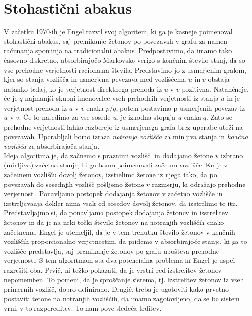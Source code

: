 \documentclass[twoside,11pt]{article}
\begin{document}
\section{Stohastični abakus}
V začetku 1970-ih je Engel razvil svoj algoritem, ki ga je kasneje poimenoval stohastični abakus, saj premikanje žetonov po povezavah v grafu za namen računanja spominja na tradicionalni abakus.
\indent Predpostavimo, da imamo tako časovno diskretno, absorbirajočo Markovsko verigo s končnim število stanj, da so vse prehodne verjetnosti racionalna števila. Predstavimo jo z usmerjenim grafom, kjer so stanja vozlišča in usmerjena povezava med vozliščema $u$ in $v$ obstaja natanko tedaj, ko je verjetnost direktnega prehoda iz $u$ v $v$ pozitivna. 
Natančneje, če je $q$ najmanjši skupni imenovalec vseh prehodnih verjetnosti iz stanja $u$ in je verjetnost prehoda iz $u$ v $v$ enaka $p/q$, potem postavimo p usmerjenih povezav iz $u$ v $v$. Če to naredimo za vse sosede $u$, je izhodna stopnja $u$ enaka $q$. Zato se prehodne verjetnosti lahko razberejo iz usmerjenega grafa brez uporabe uteži na povezavah. 
Uporabljali bomo izraza \emph{notranja vozlišča} za minljiva stanja in \emph{končna vozlišča} za absorbirajoča stanja. \\
\indent Ideja algoritma je, da začnemo s praznimi vozlišči in dodajamo žetone v izbrano (minljivo) začetno stanje, ki ga bomo poimenovali začetno vozlišče. Ko je v začetnem vozlišču dovolj žetonov, izstrelimo žetone iz njega tako, da po povezavah do sosednjih vozlišč pošljemo žetone v razmerju, ki odražajo prehodne verjetnosti. Ponavljamo postopek dodajanja žetonov v začetno vozlišče in izstreljevanja dokler nima vsak od sosedov dovolj žetonov, da izstrelimo te itn. Predstavljajmo si, da ponavljamo postopek dodajanja žetonov in izstrelitev žetonov in
da je na neki točki število žetonov na notranjih vozliščih enako začetnemu. Engel je utemeljil, da je v tem trenutku število žetonov v končnih vozliščih proporcionalno verjetnostim, da pridemo v absorbirajoče stanje, ki ga to vozlišče predstavlja, saj premikanje žetonov po grafu upošteva prehodne verjetnosti. %
\newline 
\indent S tem algoritmom sta dva potencialna problema in Engel je uspel razrešiti oba. Prvič, ni težko pokazati, da je vrstni red izstrelitev žetonov nepomemben. To pomeni, da je sproščanje sistema, tj. izstrelitev žetonov iz vseh primernih vozlišč, dobro definirano. Drugič, treba je ugotoviti kako prvotno postaviti žetone na notranjih vozliščih, da imamo zagotovljeno, da se bo sistem vrnil v to razporeditev. To nam pove sledeča trditev.  
\end{document}

